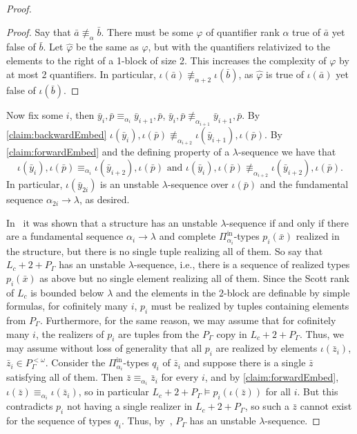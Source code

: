 \documentclass[11pt]{amsart}
\newcommand{\Pinf}[1]{\Pi^{\mathrm{in}}_{#1}}
\theoremstyle{remark}
\begin{document}
\begin{proof}
    \begin{proof}
        Say that $\bar{a}\not\equiv_{\alpha} \bar{b}$.
        There must be some $\varphi$ of quantifier rank $\alpha$ true of $\bar{a}$ yet false of $\bar{b}$.
        Let $\hat{\varphi}$ be the same as $\varphi$, but with the quantifiers relativized to the elements to the right of a 1-block of size 2.
        This increases the complexity of $\varphi$ by at most 2 quantifiers. In particular, $\iota(\bar{a})\not\equiv_{\alpha+2}\iota(\bar{b})$, as $\hat{\varphi}$ is true of $\iota(\bar{a})$ yet false of $\iota(\bar{b})$.
    \end{proof}
		Now fix some $i$, then $\bar{y}_{i},\bar{p}\equiv_{\alpha_{i}} \bar{y}_{i+1},\bar{p}$, $\bar{y}_{i},\bar{p}\not\equiv_{\alpha_{i+1}} \bar{y}_{i+1},\bar{p}$. By \cref{claim:backwardEmbed} $\iota(\bar{y}_{i}),\iota(\bar{p})\not\equiv_{\alpha_{i+2}} \iota(\bar{y}_{i+1}),\iota(\bar{p})$. By \cref{claim:forwardEmbed} and the defining property of a $\lambda$-sequence we have that
    \[\iota(\bar{y}_{i}),\iota(\bar{p})\equiv_{\alpha_i} \iota(\bar{y}_{i+2}),\iota(\bar{p}) \text{ and } \iota(\bar{y}_{i}),\iota(\bar{p})\not\equiv_{\alpha_{i+2}} \iota(\bar{y}_{i+2}),\iota(\bar{p}).\]
    In particular, $\iota(\bar{y}_{2i})$ is an unstable $\lambda$-sequence over $\iota(\bar{p})$ and the fundamental sequence $\alpha_{2i}\to\lambda$, as desired.
    
		In~\cite[Corollary 2.11]{GR23} it was shown that a structure has an unstable $\lambda$-sequence if and only if there are a fundamental sequence $\alpha_i\to \lambda$ and complete $\Pinf{\alpha_i}$-types $p_i(\bar x)$ realized in the structure, but there is no single tuple realizing all of them. So say that $L_c+2+P_\Gamma$ has an unstable $\lambda$-sequence, i.e., there is a sequence of realized types $p_i(\bar x)$ as above but no single element realizing all of them. Since the Scott rank of $L_c$ is bounded below $\lambda$ and the elements in the $2$-block are definable by simple formulas, for cofinitely many $i$, $p_i$ must be realized by tuples containing elements from $P_\Gamma$.
        Furthermore, for the same reason, we may assume that for cofinitely many $i$, the realizers of $p_i$ are tuples from the $P_\Gamma$ copy in $L_c+2+P_\Gamma$. Thus, we may assume without loss of generality that all $p_i$ are realized by elements $\iota(\bar z_i)$, $\bar z_i\in P_\Gamma^{<\omega}$. Consider the $\Pinf{\alpha_i}$-types $q_i$ of $\bar z_i$ and suppose there is a single $\bar z$ satisfying all of them. Then $\bar z\equiv_{\alpha_i}\bar z_i$ for every $i$, and by \cref{claim:forwardEmbed}, $\iota(\bar z)\equiv_{\alpha_i} \iota(\bar z_i)$, so in particular $L_c+2+P_\Gamma\models p_i(\iota(\bar z)) $ for all $i$. But this contradicts $p_i$ not having a single realizer in $L_c+2+P_\Gamma$, so such a $\bar z$ cannot exist for the sequence of types $q_i$. Thus, by~\cite[Corollary 2.11]{GR23}, $P_\Gamma$ has an unstable $\lambda$-sequence.
\end{proof}
\end{document}
